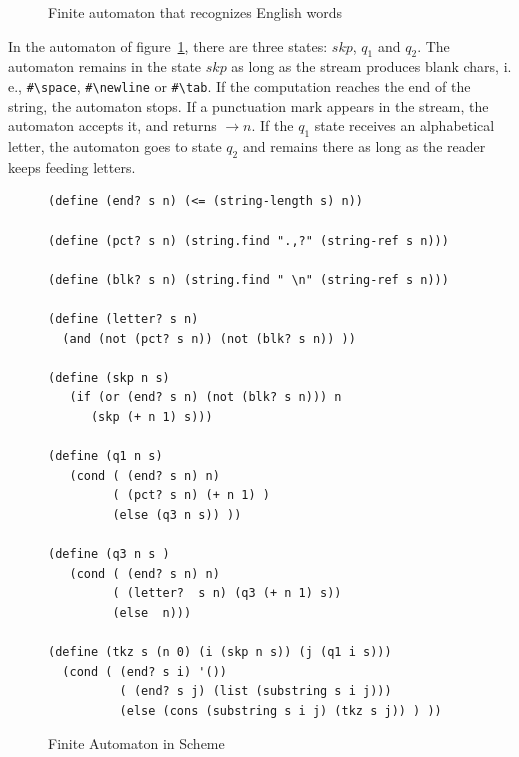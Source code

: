 \documentclass[a4paper,12pt]{book}
\newenvironment{fmpage}[1]
           {\begin{lrbox}{\fmbox}\begin{minipage}{#1}}
           {\end{minipage}\end{lrbox}\fbox{\usebox{\fmbox}}}
\begin{document}
\begin{figure}[!h]
\renewcommand\figurename{Fig.}
\caption{Finite automaton that recognizes English words}
\label{fig:automaton}
\end{figure}

In the automaton of figure~\ref{fig:automaton}, there
are three states: $skp$, $q_1$ and $q_2$.
The automaton remains in the state $skp$ as long as
the stream produces blank chars, i. e., \verb|#\space|,
\verb|#\newline| or \verb|#\tab|. If the computation
reaches the end of the string, the automaton  stops.
If a punctuation mark appears
in the stream, the automaton accepts it, and 
returns $\rightarrow n$. If the  $q_1$ state
receives an alphabetical letter, the automaton
goes to state $q_2$ and remains there 
as long as the reader keeps feeding letters.


\begin{figure}[!h]
\begin{fmpage}{0.9\linewidth}
\begin{verbatim}
(define (end? s n) (<= (string-length s) n))

(define (pct? s n) (string.find ".,?" (string-ref s n)))

(define (blk? s n) (string.find " \n" (string-ref s n)))

(define (letter? s n)
  (and (not (pct? s n)) (not (blk? s n)) ))

(define (skp n s)
   (if (or (end? s n) (not (blk? s n))) n
      (skp (+ n 1) s)))

(define (q1 n s)
   (cond ( (end? s n) n)
         ( (pct? s n) (+ n 1) )
         (else (q3 n s)) ))

(define (q3 n s )
   (cond ( (end? s n) n)
         ( (letter?  s n) (q3 (+ n 1) s))
         (else  n)))

(define (tkz s (n 0) (i (skp n s)) (j (q1 i s)))
  (cond ( (end? s i) '())
          ( (end? s j) (list (substring s i j)))
          (else (cons (substring s i j) (tkz s j)) ) ))
\end{verbatim}
\end{fmpage}
\caption{Finite Automaton in Scheme}
\label{FA-in-Scheme}
\end{figure}
\end{document}
